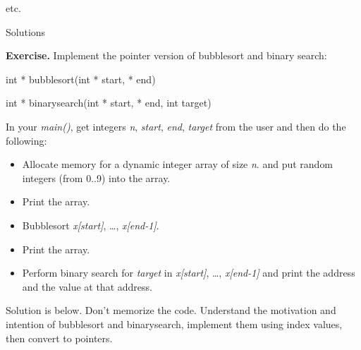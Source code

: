 \documentclass[
]{article}
\providecommand{\tightlist}{%
  \setlength{\itemsep}{0pt}\setlength{\parskip}{0pt}}
\begin{document}
etc.

Solutions

\textbf{Exercise.} Implement the pointer version of bubblesort and
binary search:

int * bubblesort(int * start, * end)

int * binarysearch(int * start, * end, int target)

In your \emph{main()}, get integers \emph{n}, \emph{start}, \emph{end},
\emph{target} from the user and then do the following:

\begin{itemize}
\tightlist
\item
  Allocate memory for a dynamic integer array of size \emph{n}. and put
  random integers (from 0..9) into the array.
\item
  Print the array.
\item
  Bubblesort \emph{x{[}start{]}}, \ldots, \emph{x{[}end-1{]}}.
\item
  Print the array.
\item
  Perform binary search for \emph{target} in \emph{x{[}start{]}},
  \ldots, \emph{x{[}end-1{]} }and print the address and the value at
  that address.
\end{itemize}

Solution is below. Don't memorize the code. Understand the motivation
and intention of bubblesort and binarysearch, implement them using index
values, then convert to pointers.
\end{document}

